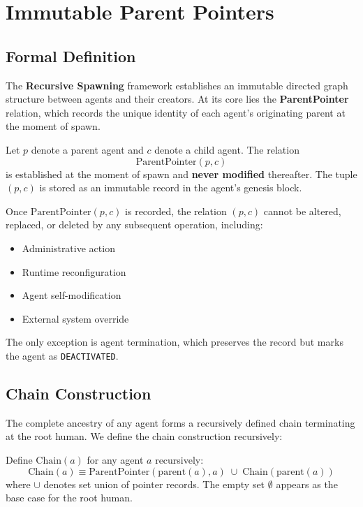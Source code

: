 \section{Immutable Parent Pointers}

\subsection{Formal Definition}

The \textbf{Recursive Spawning} framework establishes an immutable directed graph structure between agents and their creators. At its core lies the \textbf{ParentPointer} relation, which records the unique identity of each agent's originating parent at the moment of spawn.

\begin{definition}
Let $p$ denote a parent agent and $c$ denote a child agent. The relation
\[
\text{ParentPointer}(p, c)
\]
is established at the moment of spawn and \textbf{never modified} thereafter. The tuple $(p, c)$ is stored as an immutable record in the agent's genesis block.
\end{definition}

\begin{axiom}
Once $\text{ParentPointer}(p, c)$ is recorded, the relation $(p, c)$ cannot be altered, replaced, or deleted by any subsequent operation, including:
\begin{itemize}
    \item Administrative action
    \item Runtime reconfiguration
    \item Agent self-modification
    \item External system override
\end{itemize}
The only exception is agent termination, which preserves the record but marks the agent as \texttt{DEACTIVATED}.
\end{axiom}

\subsection{Chain Construction}

The complete ancestry of any agent forms a recursively defined chain terminating at the root human. We define the chain construction recursively:

\begin{definition}
Define $\text{Chain}(a)$ for any agent $a$ recursively:
\[
\text{Chain}(a) \equiv \text{ParentPointer}(\text{parent}(a), a) \;\cup\; \text{Chain}(\text{parent}(a))
\]
where $\cup$ denotes set union of pointer records. The empty set $\emptyset$ appears as the base case for the root human.
\end{definition}

